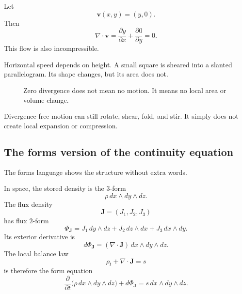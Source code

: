\begin{example}
Let
\[
    \mathbf v(x,y)=(y,0).
\]
Then
\[
    \nabla\cdot\mathbf v
    =
    \frac{\partial y}{\partial x}
    +
    \frac{\partial 0}{\partial y}
    =
    0.
\]
This flow is also incompressible.

Horizontal speed depends on height.  A small square is sheared into a slanted
parallelogram.  Its shape changes, but its area does not.

\begin{figure}[h]
\centering
{}
\caption{Zero divergence does not mean no motion.  It means no local area or volume
change.}
\end{figure}
\end{example}

Divergence-free motion can still rotate, shear, fold, and stir.  It simply does not create
local expansion or compression.

\subsection{The forms version of the continuity equation}

The forms language shows the structure without extra words.

In space, the stored density is the \(3\)-form
\[
    \rho\,dx\wedge dy\wedge dz.
\]
The flux density
\[
    \mathbf J=(J_1,J_2,J_3)
\]
has flux \(2\)-form
\[
    \Phi_{\mathbf J}
    =
    J_1\,dy\wedge dz
    +
    J_2\,dz\wedge dx
    +
    J_3\,dx\wedge dy.
\]
Its exterior derivative is
\[
    d\Phi_{\mathbf J}
    =
    (\nabla\cdot\mathbf J)\,dx\wedge dy\wedge dz.
\]
The local balance law
\[
    \rho_t+\nabla\cdot\mathbf J=s
\]
is therefore the form equation
\[
\boxed{
    \frac{\partial}{\partial t}
    \bigl(\rho\,dx\wedge dy\wedge dz\bigr)
    +
    d\Phi_{\mathbf J}
    =
    s\,dx\wedge dy\wedge dz.
}
\]

